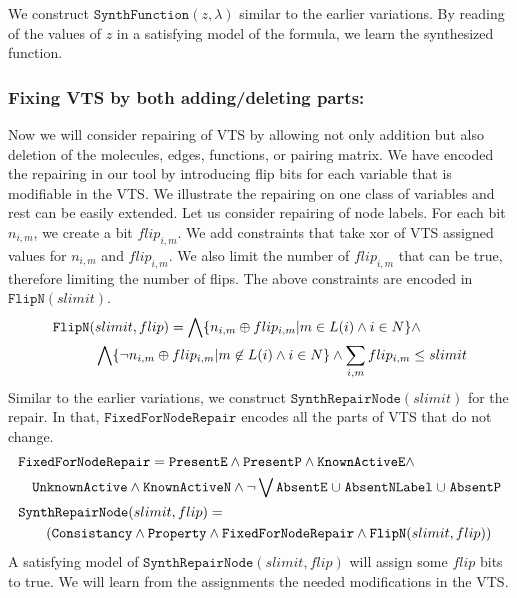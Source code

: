 We construct $\texttt{SynthFunction}(z,\lambda)$ similar to the earlier
variations.
%
By reading of the values of $z$ in a satisfying model of the formula,
we learn the synthesized function.

\subsubsection{Fixing VTS by both adding/deleting parts:}
%
Now we will consider repairing of VTS by allowing not only addition but also
deletion of the molecules, edges, functions, or pairing matrix.
%
We have encoded the repairing in our tool by introducing flip bits
for each variable that is modifiable in the VTS.
%
We illustrate the repairing on one class of variables and rest can be
easily extended.
%
Let us consider repairing of node labels.
%
For each bit $n_{i,m}$, we create a bit $flip_{i,m}$.
%
We add constraints that take xor of VTS assigned values for  $n_{i,m}$
and $flip_{i,m}$.
%
We also limit the number of $flip_{i,m}$ that can be true, therefore
limiting the number of flips.
%
The above constraints are encoded in $\texttt{FlipN}(slimit)$.
\begin{align*}
&\texttt{FlipN}(slimit,flip) = \bigwedge \{n_{i,m}\oplus flip_{i,m}| m \in L(i) \land i \in N \} \land \\
& \quad \quad \quad
\bigwedge \{ \lnot n_{i,m}\oplus flip_{i,m}| m \not \in L(i) \land i \in N \} \land  \sum\limits_{i,m} flip_{i,m} \leq slimit
\end{align*}
%
Similar to the earlier variations, we construct
$\texttt{SynthRepairNode}(slimit)$ for the repair.
%
In that, $\texttt{FixedForNodeRepair}$ encodes all the parts of VTS that do not change.
\begin{align*}
& \texttt{FixedForNodeRepair} =  \texttt{PresentE} \land  
\texttt{PresentP} \land \texttt{KnownActiveE} 
\land \\
& \quad \texttt{UnknownActive} \land \texttt{KnownActiveN} \land \lnot 
\bigvee \texttt{AbsentE} \;{\cup}\; \texttt{AbsentNLabel} \;{\cup}\;
\texttt{AbsentP}\\
&\texttt{SynthRepairNode}(slimit,flip) = \\
& \quad\quad
(  \texttt{Consistancy}\land \texttt{Property} \land
\texttt{FixedForNodeRepair} \land \texttt{FlipN}(slimit,flip) )
\end{align*}
A satisfying model of $\texttt{SynthRepairNode}(slimit,flip)$ will assign some
$flip$ bits to true.
We will learn from the assignments the needed modifications in the VTS. 

               
